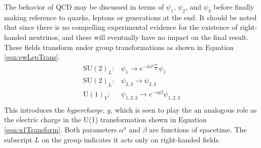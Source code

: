The behavior of QCD may be discussed in terms of $\psi_1$, $\psi_2$, and $\psi_3$ before finally making reference to quarks, leptons or generations at the end.
It should be noted that since there is no compelling experimental evidence for the existence of right-handed neutrinos, and these will eventually have no impact on the final result.
These fields transform under group transformations as shown in Equation \ref{eqn:ewLepTrans}.
\begin{equation}\begin{split}\label{eqn:ewLepTrans}
    \text{SU}(2)_L:& \psi_1\to e^{-i\alpha^a\frac{\sigma^a}{2}}\psi_1 \\
    \text{SU}(2)_L:& \psi_{2,3}\to \psi_{2,3} \\
    \text{U}(1)_Y:& \psi_{1,2,3}\to e^{-iy\beta}\psi_{1,2,3} \\
\end{split}\end{equation}
\check
This introduces the \emph{hypercharge}, $y$, which is seen to play the an analogous role as the electric charge in the U(1) transformation shown in Equation \ref{eqn:u1Transform}.
Both parameters $\alpha^a$ and $\beta$ are functions of spacetime.
The subscript $L$ on the group indicates it acts only on right-handed fields.

